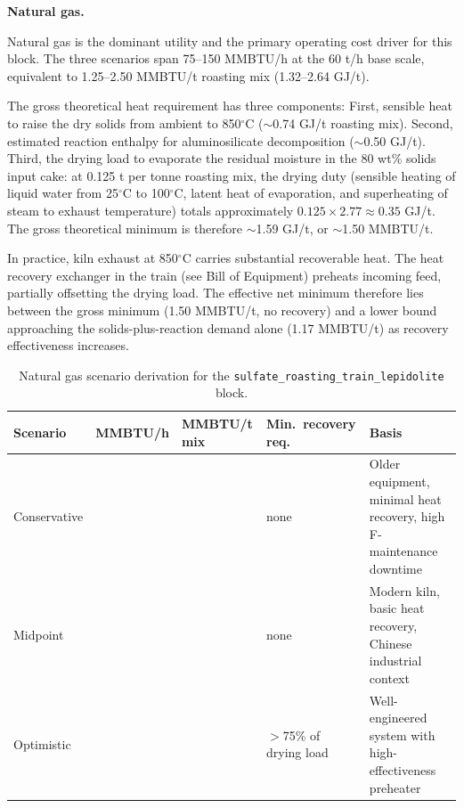 \noindent\textbf{Natural gas.}\quad

Natural gas is the dominant utility and the primary operating cost driver for this block. The three scenarios span 75--150 MMBTU/h at the 60 t/h base scale, equivalent to 1.25--2.50 MMBTU/t roasting mix (1.32--2.64 GJ/t). 

The gross theoretical heat requirement has three components: First, sensible heat to raise the dry solids from ambient to 850$^\circ$C ($\sim$0.74 GJ/t roasting mix). Second, estimated reaction enthalpy for aluminosilicate decomposition ($\sim$0.50 GJ/t). Third, the drying load to evaporate the residual moisture in the 80 wt\% solids input cake: at 0.125 t  per tonne roasting mix, the drying duty (sensible heating of liquid water from 25$^\circ$C to 100$^\circ$C, latent heat of evaporation, and superheating of steam to exhaust temperature) totals approximately $0.125 \times 2.77 \approx 0.35$ GJ/t. The gross theoretical minimum is therefore $\sim$1.59 GJ/t, or $\sim$1.50 MMBTU/t. 
 
In practice, kiln exhaust at 850$^\circ$C carries substantial recoverable heat. The heat recovery exchanger in the train (see Bill of Equipment) preheats incoming feed, partially offsetting the drying load. The effective net minimum therefore lies between the gross minimum (1.50 MMBTU/t, no recovery) and a lower bound approaching the solids-plus-reaction demand alone (1.17 MMBTU/t) as recovery effectiveness increases.

\begin{table}[h!]
\caption{Natural gas scenario derivation for the \texttt{sulfate\_roasting\_train\_lepidolite} block.}
\centering
\begin{tabular}{>{\raggedright\arraybackslash}p{2.5cm}
                >{\raggedright\arraybackslash}p{2.4cm}
                >{\raggedright\arraybackslash}p{2.4cm}
                >{\raggedright\arraybackslash}p{2.7cm}
                >{\raggedright\arraybackslash}p{5cm}}
\toprule
\textbf{Scenario} & \textbf{MMBTU/h} & \textbf{MMBTU/t mix} & \textbf{Min.\ recovery req.} & \textbf{Basis} \\
\midrule
Conservative & 150 & 2.50 & none & Older equipment, minimal heat recovery, high F-maintenance downtime \\
Midpoint     & 100 & 1.67 & none & Modern kiln, basic heat recovery, Chinese industrial context \\
Optimistic   &  75 & 1.25 & $>$75\% of drying load & Well-engineered system with high-effectiveness preheater \\
\bottomrule
\end{tabular}
\end{table}
 
